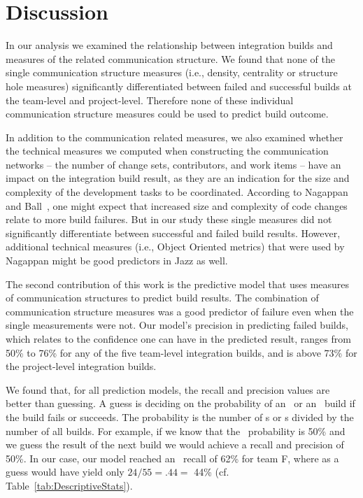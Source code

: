 \section{Discussion}
\label{sec:discussion5}
In our analysis we examined the relationship between integration builds and
measures of the related communication structure. We found that none of the single
communication structure measures (i.e., density, centrality or structure hole measures)
significantly differentiated between failed and successful builds at the
team-level and project-level. Therefore none of these individual communication
structure measures could be used to predict build outcome.

In addition to the communication related measures, we also examined whether the
technical measures we computed when constructing the communication networks --
the number of change sets, contributors, and work items -- have an impact on the
integration build result, as they are an indication for the size and complexity
of the development tasks to be coordinated. According to Nagappan and
Ball~\cite{nagappan:icse:2005}, one might expect that increased size and complexity
of code changes relate to more build failures. But in our study these single
measures did not significantly differentiate between successful and failed build
results. However, additional technical measures (i.e., Object Oriented metrics) that were used by Nagappan might be good predictors in Jazz as well.

The second contribution of this work is the predictive model that uses measures
of communication structures to predict build results. The
combination of communication structure measures was a good predictor of failure
even when the single measurements were not. Our model's precision in predicting
failed builds, which relates to the confidence one can have in the predicted
result, ranges from 50\% to 76\% for any of the five team-level integration
builds, and is above 73\% for the project-level integration builds.

We found that, for all prediction models, the recall and precision values are
better than guessing. A guess is deciding on the probability of an \error\ or an
\ok\ build if the build fails or succeeds. The probability is the number of
\error s or \ok s divided by the number of all builds. For example, if we know
that the \error\ probability is 50\% and we guess the result of the next build we
would achieve a recall and precision of 50\%. In our case, our model reached an
\error\ recall of 62\% for team F, where as a guess would have yield only
$24/55=.44=$ 44\% (cf. Table~\ref{tab:DescriptiveStats}).

